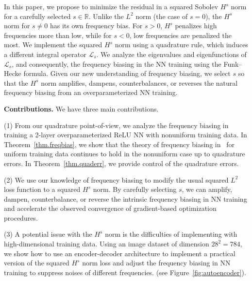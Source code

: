 \documentclass{article} %
\begin{document}
In this paper, we propose to minimize the residual in a squared Sobolev $H^s$ norm for a carefully selected $s\in\mathbb{R}$. Unlike the $L^2$ norm (the case of $s=0$), the $H^s$ norm for $s\neq 0$ has its own frequency bias. For $s>0$, $H^s$ penalizes high frequencies more than low, while for $s<0$, low frequencies are penalized the most. We implement the squared $H^s$ norm using a quadrature rule, which induces a different integral operator $\mathcal{L}_s$. We analyze the eigenvalues and eigenfunctions of $\mathcal{L}_s$, and consequently, the frequency biasing in the NN training using the Funk--Hecke formula. Given our new understanding of frequency biasing, we select $s$ so that the $H^s$ norm amplifies, dampens, counterbalances, or reverses the natural frequency biasing from an overparameterized NN training.

{\bf Contributions.} 
We have three main contributions. 

(1) From our quadrature point-of-view, we analyze the frequency biasing in training a 2-layer overparameterized ReLU NN with nonuniform training data. In Theorem~\ref{thm.freqbias}, we show that the theory of frequency biasing in~\citep{basri} for uniform training data continues to hold in the nonuniform case up to quadrature errors. In Theorem~\ref{thm.quaderr}, we provide control of the quadrature errors.

(2) We use our knowledge of frequency biasing to modify the usual squared $L^2$ loss function to a squared $H^s$ norm. By carefully selecting $s$, we can amplify, dampen, counterbalance, or reverse the intrinsic frequency biasing in NN training and accelerate the observed convergence of gradient-based optimization procedures. 

(3) A potential issue with the $H^s$ norm is the difficulties of implementing with high-dimensional training data. Using an image dataset of dimension $28^2=784$, we show how to use an encoder-decoder architecture to implement a practical version of the squared $H^s$ norm loss and adjust the frequency biasing in NN training to suppress noises of different frequencies. (see Figure~\ref{fig:autoencoder}). 
\end{document}
